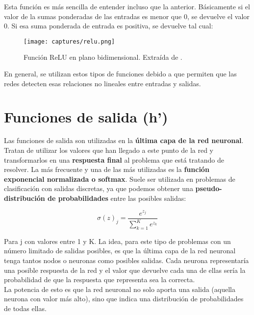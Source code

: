 \documentclass[11pt,fleqn]{book} %
\begin{document}
\begin{itemize}
	Esta función es más sencilla de entender incluso que la anterior. Básicamente si el valor de la sumas ponderadas de las entradas es menor que 0, se devuelve el valor 0. Si esa suma ponderada de entrada es positiva, se devuelve tal cual:
	
	\begin{figure}[H]
		\centering\texttt{[image: captures/relu.png]}
		\caption{Función ReLU en plano bidimensional. Extraída de \cite{article:redNeuronal2}.}
		\label{fig:relu} %
	\end{figure}
\end{itemize}

En general, se utilizan estos tipos de funciones debido a que permiten que las redes detecten esas relaciones no lineales entre entradas y salidas. 

\section{Funciones de salida (h')}\label{sec:funcionsalida}

Las funciones de salida son utilizadas en la \textbf{última capa de la red neuronal}. Tratan de utilizar los valores que han llegado a este punto de la red y transformarlos en una \textbf{respuesta final} al problema que está tratando de resolver. La más frecuente y una de las más utilizadas es la \textbf{función exponencial normalizada o softmax}. Suele ser utilizada en problemas de clasificación con salidas discretas, ya que podemos obtener una \textbf{pseudo-distribución de probabilidades} entre las posibles salidas:

\begin{equation}
\sigma(z)_j = \frac{e^{z_j}}{\sum^K_{k=1}e^{z_k}}
\end{equation}

Para j con valores entre 1 y K. La idea, para este tipo de problemas con un número limitado de salidas posibles,  es que la última capa de la red neuronal tenga tantos nodos o neuronas como posibles salidas. Cada neurona representaría una posible respuesta de la red y el valor que devuelve cada una de ellas sería la probabilidad de que la respuesta que representa sea la correcta. \\

La potencia de esto es que la red neuronal no solo aporta una salida (aquella neurona con valor más alto), sino que indica una distribución de probabilidades de todas ellas. 
\end{document}
